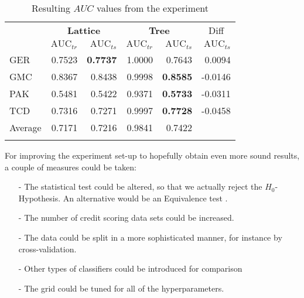 \begin{table}[!htb]
	\begin{center}
		\small
		\begin{tabular}[t]{lrrrrr}
		\toprule
		\multicolumn{1}{c}{ } & \multicolumn{2}{c}{\textbf{Lattice}} & \multicolumn{2}{c}{\textbf{Tree}} & \multicolumn{1}{c}{Diff} \\
		\cmidrule(l{3pt}r{3pt}){2-3} \cmidrule(l{3pt}r{3pt}){4-5} \cmidrule(l{3pt}r{3pt}){6-6}
				 & $\mathrm{AUC}_{tr} $ & $\mathrm{AUC}_{ts}$  & $\mathrm{AUC}_{tr}$ & $\mathrm{AUC}_{ts}$ & $\mathrm{AUC}_{ts}$\\
		\midrule
		GER & 0.7523 & \textbf{0.7737} & 1.0000 & 0.7643 & 0.0094\\
		GMC & 0.8367 & 0.8438 & 0.9998 & \textbf{0.8585} & -0.0146\\
		PAK & 0.5481 & 0.5422 & 0.9371 & \textbf{0.5733} & -0.0311\\
		TCD & 0.7316 & 0.7271 & 0.9997 &\textbf{ 0.7728} & -0.0458\\
		\midrule
		Average & 0.7171 & 0.7216 & 0.9841 & 0.7422 & \\ 
		\addlinespace
		\bottomrule
		\end{tabular}
	\caption{Resulting $AUC$ values from the experiment}
	\label{tab:res}
	\end{center}
\end{table}
\vspace*{-0.6cm}
For improving the experiment set-up to hopefully obtain even more sound results, a couple of measures could be taken:
\begin{itemize}
	\setlength\itemsep{-0.05em}
	\item[-] The statistical test could be altered, so that we actually reject the $H_0$-Hypothesis. An alternative would be an Equivalence test \citep{walker2011understanding}.
	\item[-] The number of credit scoring data sets could be increased.
	\item[-] The data could be split in a more sophisticated manner, for instance by cross-validation.
	\item[-] Other types of classifiers could be introduced for comparison
	\item[-] The grid could be tuned for all of the hyperparameters.
\end{itemize}

